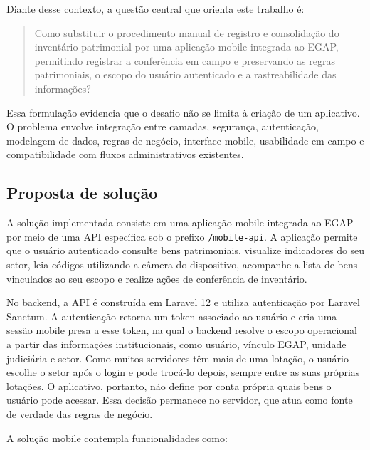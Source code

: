 \documentclass[12pt,a4paper]{article}
\begin{document}
Diante desse contexto, a questão central que orienta este trabalho é:

\begin{quote}
Como substituir o procedimento manual de registro e consolidação do inventário patrimonial por uma aplicação mobile integrada ao EGAP, permitindo registrar a conferência em campo e preservando as regras patrimoniais, o escopo do usuário autenticado e a rastreabilidade das informações?
\end{quote}

Essa formulação evidencia que o desafio não se limita à criação de um aplicativo. O problema envolve integração entre camadas, segurança, autenticação, modelagem de dados, regras de negócio, interface mobile, usabilidade em campo e compatibilidade com fluxos administrativos existentes.

\subsection{Proposta de solução}

A solução implementada consiste em uma aplicação mobile integrada ao EGAP por meio de uma API específica sob o prefixo \texttt{/mobile-api}. A aplicação permite que o usuário autenticado consulte bens patrimoniais, visualize indicadores do seu setor, leia códigos utilizando a câmera do dispositivo, acompanhe a lista de bens vinculados ao seu escopo e realize ações de conferência de inventário.

No backend, a API é construída em Laravel 12 e utiliza autenticação por Laravel Sanctum. A autenticação retorna um token associado ao usuário e cria uma sessão mobile presa a esse token, na qual o backend resolve o escopo operacional a partir das informações institucionais, como usuário, vínculo EGAP, unidade judiciária e setor. Como muitos servidores têm mais de uma lotação, o usuário escolhe o setor após o login e pode trocá-lo depois, sempre entre as suas próprias lotações. O aplicativo, portanto, não define por conta própria quais bens o usuário pode acessar. Essa decisão permanece no servidor, que atua como fonte de verdade das regras de negócio.

A solução mobile contempla funcionalidades como:
\end{document}
